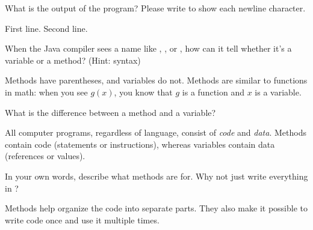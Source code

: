 \Q What is the output of the program? Please write \java{\\n} to show each newline character.

\begin{answer}[8em]
\vspace{-1ex}
\begin{javaans}
First line.\n
\n
\n
\n
Second line.\n
\end{javaans}
\end{answer}


\Q When the Java compiler sees a name like , , or , how can it tell whether it's a variable or a method? (Hint: syntax)

\begin{answer}[5em]
Methods have parentheses, and variables do not.
Methods are similar to functions in math: when you see $g(x)$, you know that $g$ is a function and $x$ is a variable.
\end{answer}


\Q What is the difference between a method and a variable?

\begin{answer}[5em]
All computer programs, regardless of language, consist of \emph{code} and \emph{data}.
Methods contain code (statements or instructions), whereas variables contain data (references or values).
\end{answer}


\Q \label{key1}
In your own words, describe what methods are for. Why not just write everything in ?

\begin{answer}[5em]
Methods help organize the code into separate parts.
They also make it possible to write code once and use it multiple times.
\end{answer}
